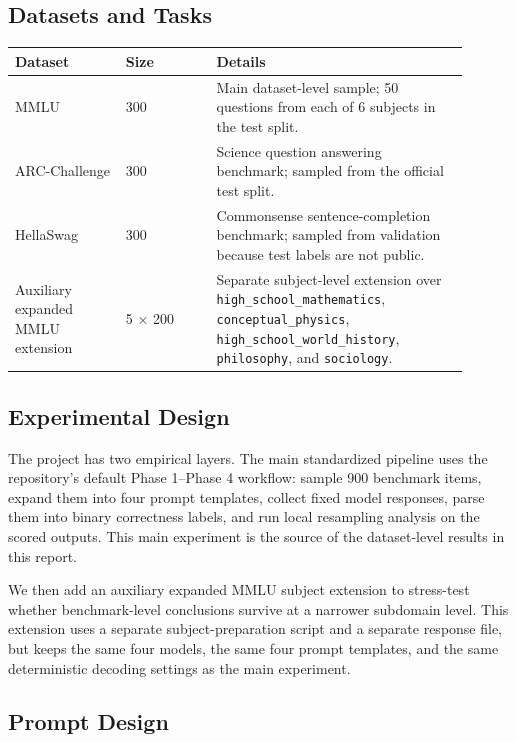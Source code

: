 \documentclass[11pt]{article}
\theoremstyle{definition}
\begin{document}
\subsection{Datasets and Tasks}

\begin{center}
\begin{tabular}{@{}p{0.22\linewidth} p{0.18\linewidth} p{0.50\linewidth}@{}}
\toprule
\textbf{Dataset} & \textbf{Size} & \textbf{Details} \\
\midrule
MMLU & 300 & Main dataset-level sample; 50 questions from each of 6 subjects in the test split. \\
ARC-Challenge & 300 & Science question answering benchmark; sampled from the official test split. \\
HellaSwag & 300 & Commonsense sentence-completion benchmark; sampled from validation because test labels are not public. \\
Auxiliary expanded MMLU extension & 5 $\times$ 200 & Separate subject-level extension over \texttt{high\_school\_mathematics}, \texttt{conceptual\_physics}, \texttt{high\_school\_world\_history}, \texttt{philosophy}, and \texttt{sociology}. \\
\bottomrule
\end{tabular}
\end{center}

\subsection{Experimental Design}

The project has two empirical layers. The main standardized pipeline uses the repository's default Phase 1--Phase 4 workflow: sample 900 benchmark items, expand them into four prompt templates, collect fixed model responses, parse them into binary correctness labels, and run local resampling analysis on the scored outputs. This main experiment is the source of the dataset-level results in this report.

We then add an auxiliary expanded MMLU subject extension to stress-test whether benchmark-level conclusions survive at a narrower subdomain level. This extension uses a separate subject-preparation script and a separate response file, but keeps the same four models, the same four prompt templates, and the same deterministic decoding settings as the main experiment.

\subsection{Prompt Design}
\end{document}
